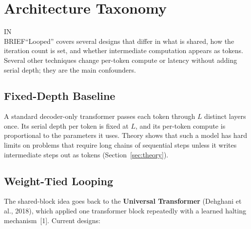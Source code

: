 \documentclass[11pt,letterpaper]{article}
\newcommand{\inbrief}[1]{\begin{inbriefbox}IN\\BRIEF\tcblower #1\end{inbriefbox}}
\begin{document}
\section{Architecture Taxonomy}
\label{sec:taxonomy}

\inbrief{``Looped'' covers several designs that differ in what is shared, how the iteration count is set, and whether intermediate computation appears as tokens. Several other techniques change per-token compute or latency without adding serial depth; they are the main confounders.}

\subsection{Fixed-Depth Baseline}

A standard decoder-only transformer passes each token through $L$ distinct layers once. Its serial depth per token is fixed at $L$, and its per-token compute is proportional to the parameters it uses. Theory shows that such a model has hard limits on problems that require long chains of sequential steps unless it writes intermediate steps out as tokens (Section~\ref{sec:theory}).

\subsection{Weight-Tied Looping}
\label{sec:looping}

The shared-block idea goes back to the \textbf{Universal Transformer} (Dehghani et al., 2018), which applied one transformer block repeatedly with a learned halting mechanism~[1]. Current designs:
\end{document}
